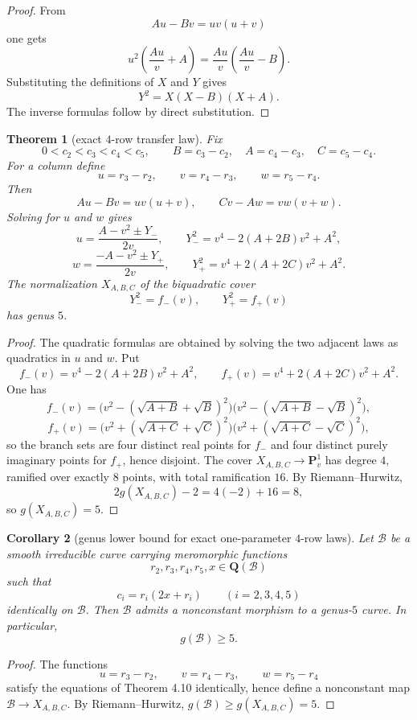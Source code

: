 \documentclass[11pt]{article}
\theoremstyle{plainbreak}
\newtheorem{theorem}{Theorem}[section]
\newtheorem{corollary}[theorem]{Corollary}
\theoremstyle{defbreak}
\newcommand{\Q}{\mathbf{Q}}
\newcommand{\PP}{\mathbf{P}}
\begin{document}
\begin{proof}
From
\[
A u-B v=u v(u+v)
\]
one gets
\[
u^2\left(\frac{A u}{v}+A\right)
=
\frac{A u}{v}\left(\frac{A u}{v}-B\right).
\]
Substituting the definitions of $X$ and $Y$ gives
\[
Y^2=X(X-B)(X+A).
\]
The inverse formulas follow by direct substitution.
\end{proof}

\begin{theorem}[exact $4$-row transfer law]
Fix
\[
0<c_2<c_3<c_4<c_5,
\qquad
B=c_3-c_2,\quad A=c_4-c_3,\quad C=c_5-c_4.
\]
For a column define
\[
u=r_3-r_2,\qquad v=r_4-r_3,\qquad w=r_5-r_4.
\]
Then
\[
A u-B v=u v(u+v),
\qquad
C v-A w=v w(v+w).
\]
Solving for $u$ and $w$ gives
\[
u=\frac{A-v^2\pm Y_-}{2v},
\qquad
Y_-^2=v^4-2(A+2B)v^2+A^2,
\]
\[
w=\frac{-A-v^2\pm Y_+}{2v},
\qquad
Y_+^2=v^4+2(A+2C)v^2+A^2.
\]
The normalization $X_{A,B,C}$ of the biquadratic cover
\[
Y_-^2=f_-(v),\qquad
Y_+^2=f_+(v)
\]
has genus $5$.
\end{theorem}

\begin{proof}
The quadratic formulas are obtained by solving the two adjacent laws as quadratics in $u$ and $w$.  Put
\[
f_-(v)=v^4-2(A+2B)v^2+A^2,\qquad
f_+(v)=v^4+2(A+2C)v^2+A^2.
\]
One has
\[
f_-(v)=\bigl(v^2-(\sqrt{A+B}+\sqrt B)^2\bigr)\bigl(v^2-(\sqrt{A+B}-\sqrt B)^2\bigr),
\]
\[
f_+(v)=\bigl(v^2+(\sqrt{A+C}+\sqrt C)^2\bigr)\bigl(v^2+(\sqrt{A+C}-\sqrt C)^2\bigr),
\]
so the branch sets are four distinct real points for $f_-$ and four distinct purely imaginary points for $f_+$, hence disjoint.  The cover $X_{A,B,C}\to \PP^1_v$ has degree $4$, ramified over exactly $8$ points, with total ramification $16$. By Riemann--Hurwitz,
\[
2g(X_{A,B,C})-2=4(-2)+16=8,
\]
so $g(X_{A,B,C})=5$.
\end{proof}

\begin{corollary}[genus lower bound for exact one-parameter $4$-row laws]
Let $\mathcal B$ be a smooth irreducible curve carrying meromorphic functions
\[
r_2,r_3,r_4,r_5,x\in \Q(\mathcal B)
\]
such that
\[
c_i=r_i(2x+r_i)\qquad (i=2,3,4,5)
\]
identically on $\mathcal B$. Then $\mathcal B$ admits a nonconstant morphism to a genus-$5$ curve. In particular,
\[
g(\mathcal B)\ge 5.
\]
\end{corollary}

\begin{proof}
The functions
\[
u=r_3-r_2,\qquad v=r_4-r_3,\qquad w=r_5-r_4
\]
satisfy the equations of Theorem 4.10 identically, hence define a nonconstant map $\mathcal B\to X_{A,B,C}$.  By Riemann--Hurwitz, $g(\mathcal B)\ge g(X_{A,B,C})=5$.
\end{proof}
\end{document}

